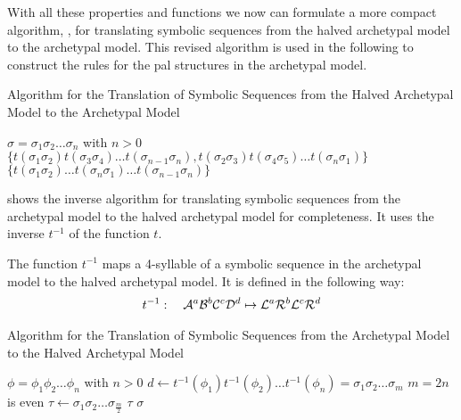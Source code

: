 With all these properties and functions we now can formulate a more compact algorithm, , for translating symbolic sequences from the halved archetypal model to the archetypal model.
This revised algorithm is used in the following to construct the rules for the \gls{pal} structures in the archetypal model.

\begin{algorithm}
	\caption{Algorithm for the Translation of Symbolic Sequences from the Halved Archetypal Model to the Archetypal Model}
	\label{alg:halved.to.full}
	\begin{algorithmic}
		\Require $\sigma = \sigma_1\sigma_2 \dots \sigma_n$ with $n > 0$
		\State \Return $\{t(\sigma_1\sigma_2) t(\sigma_3\sigma_4) \dots t(\sigma_{n-1}\sigma_n), t(\sigma_2\sigma_3) t(\sigma_4\sigma_5) \dots t(\sigma_n\sigma_1)\}$
		\Else
		\State \Return $\{t(\sigma_1\sigma_2) \dots t(\sigma_{n}\sigma_1) \dots t(\sigma_{n-1}\sigma_n)\}$
		\EndIf
	\end{algorithmic}
\end{algorithm}

\clearpage

 shows the inverse algorithm for translating symbolic sequences from the archetypal model to the halved archetypal model for completeness.
It uses the inverse $t^{-1}$ of the function $t$.

\begin{definition}
	The function $t^{-1}$ maps a 4-syllable of a symbolic sequence in the archetypal model to the halved archetypal model.
	It is defined in the following way:
	\begin{align}
		t^{-1}: \quad \mathcal{A}^a\mathcal{B}^b\mathcal{C}^c\mathcal{D}^d \mapsto \mathcal{L}^a\mathcal{R}^b\mathcal{L}^c\mathcal{R}^d
	\end{align}
\end{definition}

\begin{algorithm}
	\caption{Algorithm for the Translation of Symbolic Sequences from the Archetypal Model to the Halved Archetypal Model}
	\label{alg:full.to.halved}
	\begin{algorithmic}
		\Require $\phi = \phi_1\phi_2 \dots \phi_n$ with $n > 0$
		\State $d \gets t^{-1}(\phi_1)t^{-1}(\phi_2) \dots t^{-1}(\phi_n) = \sigma_1\sigma_2 \dots \sigma_m$
		\Comment $m = 2n$ is even
		\State $\tau \gets \sigma_1\sigma_2 \dots \sigma_{\frac{m}{2}}$
		\If{$\sigma = \tau^2$}
		\State \Return $\tau$
		\Else
		\State \Return $\sigma$
		\EndIf
	\end{algorithmic}
\end{algorithm}
